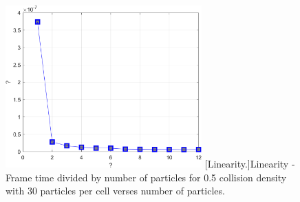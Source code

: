 \begin{figure}[h]
\centering
\includegraphics[width=2.97in]{../plots/Perf_VCUBE031.png}
[Linearity.]{Linearity - Frame time divided by number of particles for 0.5 collision density with 30 particles per cell verses number of particles.}
\label{fig:Perf_VCUBE03}
\end{figure}
